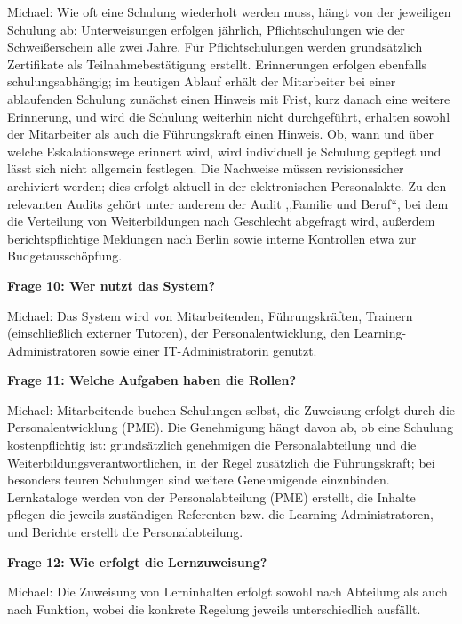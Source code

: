 \documentclass[
    12pt, 
    a4paper,
    ]{scrartcl} %
\begin{document}
Michael: Wie oft eine Schulung wiederholt werden muss, h\"angt von der jeweiligen Schulung ab: Unterweisungen erfolgen j\"ahrlich, Pflichtschulungen wie der Schwei{\ss}erschein alle zwei Jahre. F\"ur Pflichtschulungen werden grunds\"atzlich Zertifikate als Teilnahmebest\"atigung erstellt. Erinnerungen erfolgen ebenfalls schulungsabh\"angig; im heutigen Ablauf erh\"alt der Mitarbeiter bei einer ablaufenden Schulung zun\"achst einen Hinweis mit Frist, kurz danach eine weitere Erinnerung, und wird die Schulung weiterhin nicht durchgef\"uhrt, erhalten sowohl der Mitarbeiter als auch die F\"uhrungskraft einen Hinweis. Ob, wann und \"uber welche Eskalationswege erinnert wird, wird individuell je Schulung gepflegt und l\"asst sich nicht allgemein festlegen. Die Nachweise m\"ussen revisionssicher archiviert werden; dies erfolgt aktuell in der elektronischen Personalakte. Zu den relevanten Audits geh\"ort unter anderem der Audit ,,Familie und Beruf``, bei dem die Verteilung von Weiterbildungen nach Geschlecht abgefragt wird, au{\ss}erdem berichtspflichtige Meldungen nach Berlin sowie interne Kontrollen etwa zur Budgetaussch\"opfung.

\bigskip
{}

\textbf{Frage 10: Wer nutzt das System?}

Michael: Das System wird von Mitarbeitenden, F\"uhrungskr\"aften, Trainern (einschlie{\ss}lich externer Tutoren), der Personalentwicklung, den Learning-Administratoren sowie einer IT-Administratorin genutzt.

\medskip
\textbf{Frage 11: Welche Aufgaben haben die Rollen?}

Michael: Mitarbeitende buchen Schulungen selbst, die Zuweisung erfolgt durch die Personalentwicklung (PME). Die Genehmigung h\"angt davon ab, ob eine Schulung kostenpflichtig ist: grunds\"atzlich genehmigen die Personalabteilung und die Weiterbildungsverantwortlichen, in der Regel zus\"atzlich die F\"uhrungskraft; bei besonders teuren Schulungen sind weitere Genehmigende einzubinden. Lernkataloge werden von der Personalabteilung (PME) erstellt, die Inhalte pflegen die jeweils zust\"andigen Referenten bzw. die Learning-Administratoren, und Berichte erstellt die Personalabteilung.

\bigskip
{}

\textbf{Frage 12: Wie erfolgt die Lernzuweisung?}

Michael: Die Zuweisung von Lerninhalten erfolgt sowohl nach Abteilung als auch nach Funktion, wobei die konkrete Regelung jeweils unterschiedlich ausf\"allt.
\end{document}
